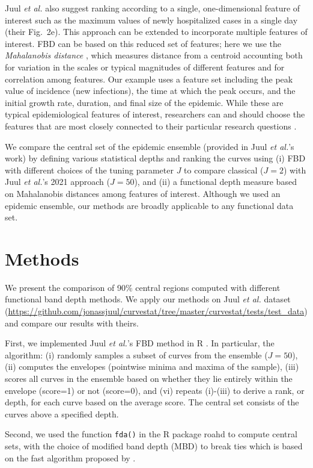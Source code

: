 \documentclass[fleqn,10pt,lineno]{wlpeerj}
\newcommand{\pkg}[1]{\textsf{#1}}  %
\newcommand{\juul}{Juul \emph{et al.}\xspace}  %
\begin{document}
\juul also suggest ranking according to a single, one-dimensional feature of interest such as the maximum values of newly hospitalized cases in a single day (their Fig.~2e). This approach can be extended to incorporate multiple features of interest. FBD can be based on this reduced set of features; here we use the \emph{Mahalanobis distance} \citep{mahalanobis1936generalized}, which measures distance from a centroid accounting both for variation in the scales or typical magnitudes of different features and for correlation among features. Our example uses a feature set including the peak value of incidence (new infections), the time at which the peak occurs, and the initial growth rate, duration, and final size of the epidemic. While these are typical epidemiological features of interest, researchers can and should choose the features that are most closely connected to their particular research questions \citep{probert2016decision}.

We compare the central set of the epidemic ensemble (provided in \juul's work) by defining various statistical depths and ranking the curves using (i) FBD with different choices of the tuning parameter $J$ to compare classical ($J=2$) with \juul's 2021 approach ($J=50$), and (ii) a functional depth measure based on Mahalanobis distances among features of interest.
Although we used an epidemic ensemble, our methods are broadly applicable to any functional data set.

\section*{Methods}

We present the comparison of 90\% central regions computed with different functional band depth methods. We apply our methods on \juul dataset (\url{https://github.com/jonassjuul/curvestat/tree/master/curvestat/tests/test_data}) and compare our results with theirs.

First, we implemented \juul's FBD method in R \citep{R}. In particular, the algorithm: (i) randomly samples a subset of curves from the ensemble ($J=50$), (ii) computes the envelopes (pointwise minima and maxima of the sample), (iii) scores all curves in the ensemble based on whether they lie entirely within the envelope (score=1) or not (score=0), and (vi) repeats (i)-(iii) to derive a rank, or depth, for each curve based on the average score. The central set consists of the curves above a specified depth.

Second, we used the function {\tt fda()} in the R package \pkg{roahd} \citep{roahd} to compute central sets, with the choice of modified band depth (MBD) to break ties which is based on the fast algorithm proposed by \cite{sun2012exact}.
\end{document}
